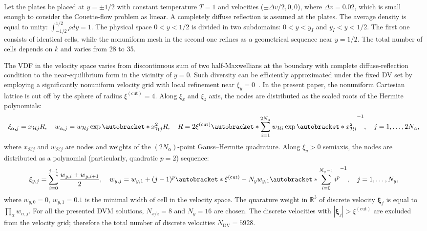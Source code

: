 \documentclass{elsarticle} %
\DeclarePairedDelimiter\autobracket()       %
\newcommand{\br}[1]{\autobracket*{#1}}
\newcommand{\bxi}{\boldsymbol{\xi}}
\newcommand{\DV}{\mathrm{DV}}
\newcommand{\Herm}{\mathcal{H}}
\newcommand{\cut}{{(\mathrm{cut})}}
\newcommand{\xiaj}{\xi_{\alpha,j}}
\begin{document}
Let the plates be placed at \(y = \pm 1/2\) with constant temperature \(T = 1\)
and velocities (\(\pm\Delta v/2,0,0\)), where \(\Delta v=0.02\),
which is small enough to consider the Couette-flow problem as linear.
A completely diffuse reflection is assumed at the plates.
The average density is equal to unity: \(\int_{-1/2}^{1/2}\rho dy=1\).
The physical space \(0 < y < 1/2\) is divided in two subdomains: \(0 < y < y_I\) and \(y_I < y < 1/2\).
The first one consists of identical cells,
while the nonuniform mesh in the second one refines as a geometrical sequence near \(y = 1/2\).
The total number of cells depends on \(k\) and varies from 28 to 35.

The VDF in the velocity space varies from discontinuous sum of two half-Maxwellians at the boundary
with complete diffuse-reflection condition to the near-equilibrium form in the vicinity of \(y=0\).
Such diversity can be efficiently approximated under the fixed DV set by employing
a significantly nonuniform velocity grid with local refinement near \(\xi_y=0\)~\cite{Ohwada1990, Wu2014, Rogozin2016}.
In the present paper, the nonuniform Cartesian lattice is cut off by the sphere of radius \(\xi^\cut=4\).
Along \(\xi_x\) and \(\xi_z\) axis, the nodes are distributed as the scaled roots of the Hermite polynomials:
\begin{equation}\label{eq:vgrid_hermite}
    \xiaj = x_{\Herm j} R, \quad w_{\alpha,j} = w_{\Herm j}\exp\br{x_{\Herm j}^2}R, \quad
    R = 2\xi^\cut \br{ \sum_{i=1}^{2N_{\alpha}} w_{\Herm i} \exp\br{x_{\Herm i}^2} }^{-1}, \quad
    j = 1,\dots,2N_{\alpha},
\end{equation}
where \(x_{\Herm j}\) and \(w_{\Herm j}\) are nodes and weights of the \((2N_{\alpha})\)-point Gauss--Hermite quadrature.
Along \(\xi_y>0\) semiaxis, the nodes are distributed as a polynomial (particularly, quadratic \(p=2\)) sequence:
\begin{equation}\label{eq:vgrid_polynomial}
    \xi_{y,j} = \sum_{i=0}^{j-1} \frac{w_{y,i} + w_{y,i+1}}2, \quad
    w_{y,j} = w_{y,1} + (j-1)^p \br{\xi^\cut - N_y w_{y,1}} \br{\sum_{i=0}^{N_y-1} i^p}^{-1}, \quad
    j = 1,\dots,N_y,
\end{equation}
where \(w_{y,0}=0\), \(w_{y,1}=0.1\) is the minimal width of cell in the velocity space.
The quarature weight in \(\mathbb{R}^3\) of discrete velocity \(\bxi_j\)
is equal to \(\prod_\alpha w_{\alpha,j}\).
For all the presented DVM solutions, \(N_{x/z}=8\) and \(N_y=16\) are chosen.
The discrete velocities with \(|\bxi_j| > \xi^\cut\) are excluded from the velocity grid;
therefore the total number of discrete velocities \(N_\DV=5928\).
\end{document}
